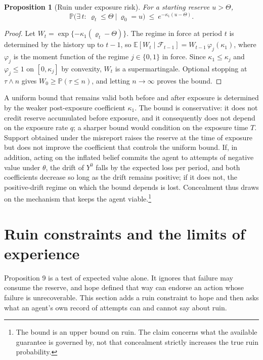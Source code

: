 \documentclass[11pt]{article}
\newtheorem{proposition}{Proposition}
\theoremstyle{remark}
\newcommand{\E}{\mathbb{E}}
\renewcommand{\Pr}{\mathbb{P}}
\begin{document}
\begin{proposition}[Ruin under exposure risk]
For a starting reserve $u>\Theta$,
\[
\Pr\bigl(\exists\,t:\ \varrho_t\le\Theta\ \big|\ \varrho_0=u\bigr)\ \le\ e^{-\kappa_1(u-\Theta)} .
\]
\end{proposition}

\begin{proof}
Let $W_t=\exp\{-\kappa_1(\varrho_t-\Theta)\}$. The regime in force at period $t$ is determined by the history up to $t-1$, so $\E[W_t\mid\mathcal F_{t-1}]=W_{t-1}\,\varphi_j(\kappa_1)$, where $\varphi_j$ is the moment function of the regime $j\in\{0,1\}$ in force. Since $\kappa_1\le\kappa_j$ and $\varphi_j\le1$ on $[0,\kappa_j]$ by convexity, $W_t$ is a supermartingale. Optional stopping at $\tau\wedge n$ gives $W_0\ge\Pr(\tau\le n)$, and letting $n\to\infty$ proves the bound.
\end{proof}

A uniform bound that remains valid both before and after exposure is determined by the weaker post-exposure coefficient $\kappa_1$. The bound is conservative: it does not credit reserve accumulated before exposure, and it consequently does not depend on the exposure rate $q$; a sharper bound would condition on the exposure time $T$. Support obtained under the misreport raises the reserve at the time of exposure but does not improve the coefficient that controls the uniform bound. If, in addition, acting on the inflated belief commits the agent to attempts of negative value under $\theta$, the drift of $Y^0$ falls by the expected loss per period, and both coefficients decrease so long as the drift remains positive; if it does not, the positive-drift regime on which the bound depends is lost. Concealment thus draws on the mechanism that keeps the agent viable.\footnote{The bound is an upper bound on ruin. The claim concerns what the available guarantee is governed by, not that concealment strictly increases the true ruin probability.}

\section{Ruin constraints and the limits of experience}

Proposition 9 is a test of expected value alone. It ignores that failure may consume the reserve, and hope defined that way can endorse an action whose failure is unrecoverable. This section adds a ruin constraint to hope and then asks what an agent's own record of attempts can and cannot say about ruin.
\end{document}
